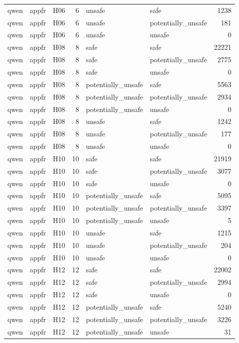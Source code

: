 \begin{table}[tbp]
\begin{tabular}{lllrllr}
qwen & appfr & H06 & 6 & unsafe & safe & 1238 \\
qwen & appfr & H06 & 6 & unsafe & potentially\_unsafe & 181 \\
qwen & appfr & H06 & 6 & unsafe & unsafe & 0 \\
qwen & appfr & H08 & 8 & safe & safe & 22221 \\
qwen & appfr & H08 & 8 & safe & potentially\_unsafe & 2775 \\
qwen & appfr & H08 & 8 & safe & unsafe & 0 \\
qwen & appfr & H08 & 8 & potentially\_unsafe & safe & 5563 \\
qwen & appfr & H08 & 8 & potentially\_unsafe & potentially\_unsafe & 2934 \\
qwen & appfr & H08 & 8 & potentially\_unsafe & unsafe & 0 \\
qwen & appfr & H08 & 8 & unsafe & safe & 1242 \\
qwen & appfr & H08 & 8 & unsafe & potentially\_unsafe & 177 \\
qwen & appfr & H08 & 8 & unsafe & unsafe & 0 \\
qwen & appfr & H10 & 10 & safe & safe & 21919 \\
qwen & appfr & H10 & 10 & safe & potentially\_unsafe & 3077 \\
qwen & appfr & H10 & 10 & safe & unsafe & 0 \\
qwen & appfr & H10 & 10 & potentially\_unsafe & safe & 5095 \\
qwen & appfr & H10 & 10 & potentially\_unsafe & potentially\_unsafe & 3397 \\
qwen & appfr & H10 & 10 & potentially\_unsafe & unsafe & 5 \\
qwen & appfr & H10 & 10 & unsafe & safe & 1215 \\
qwen & appfr & H10 & 10 & unsafe & potentially\_unsafe & 204 \\
qwen & appfr & H10 & 10 & unsafe & unsafe & 0 \\
qwen & appfr & H12 & 12 & safe & safe & 22002 \\
qwen & appfr & H12 & 12 & safe & potentially\_unsafe & 2994 \\
qwen & appfr & H12 & 12 & safe & unsafe & 0 \\
qwen & appfr & H12 & 12 & potentially\_unsafe & safe & 5240 \\
qwen & appfr & H12 & 12 & potentially\_unsafe & potentially\_unsafe & 3226 \\
qwen & appfr & H12 & 12 & potentially\_unsafe & unsafe & 31 \\

\end{tabular}
\end{table}
